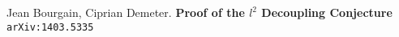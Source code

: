 \documentclass[12pt]{article}
\begin{document}
\newpage

\noindent 

\selectfont \fontsize{12}{10}\selectfont


\begin{thebibliography}{}

\item Jean Bourgain, Ciprian Demeter. \textbf{Proof of the $l^2$ Decoupling Conjecture} \texttt{ arXiv:1403.5335}


\end{thebibliography}
\end{document}
